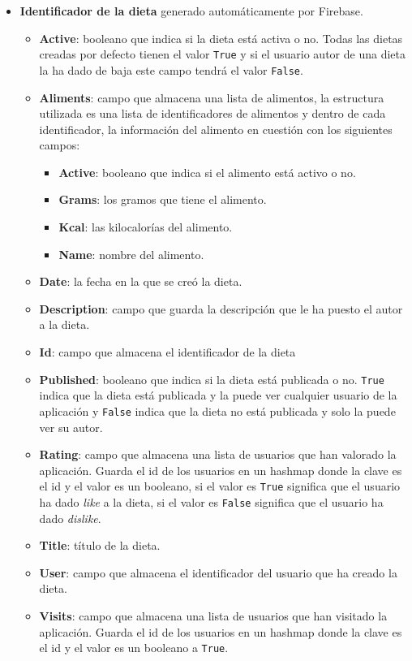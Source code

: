 \begin{itemize}
\item \textbf{Identificador de la dieta} generado automáticamente por Firebase.
    \begin{itemize}
        \item \textbf{Active}: booleano que indica si la dieta está activa o no. Todas las dietas creadas por defecto tienen el valor \texttt{True} y si el usuario autor de una dieta la ha dado de baja este campo tendrá el valor  \texttt{False}.
        \item \textbf{Aliments}: campo que almacena una lista de alimentos, la estructura utilizada es una lista de identificadores de alimentos y dentro de cada identificador, la información del alimento en cuestión con los siguientes campos:
        \begin{itemize}
            \item \textbf{Active}: booleano que indica si el alimento está activo o no.
            \item \textbf{Grams}: los gramos que tiene el alimento.
            \item \textbf{Kcal}: las kilocalorías del alimento.
            \item \textbf{Name}: nombre del alimento.
        \end{itemize}
        
        \item \textbf{Date}: la fecha en la que se creó la dieta.
        \item \textbf{Description}: campo que guarda la descripción que le ha puesto el autor a la dieta.
        \item \textbf{Id}: campo que almacena el identificador de la dieta
        \item \textbf{Published}: booleano que indica si la dieta está publicada o no. \texttt{True} indica que la dieta está publicada y la puede ver cualquier usuario de la aplicación y \texttt{False} indica que la dieta no está publicada y solo la puede ver su autor.
        \item \textbf{Rating}: campo que almacena una lista de usuarios que han valorado la aplicación. Guarda el id de los usuarios en un hashmap donde la clave es el id y el valor es un booleano, si el valor es \texttt{True} significa que el usuario ha dado \textit{like} a la dieta, si el valor es \texttt{False} significa que el usuario ha dado \textit{dislike}.
        \item \textbf{Title}: título de la dieta.
        \item \textbf{User}: campo que almacena el identificador del usuario que ha creado la dieta.
        \item \textbf{Visits}: campo que almacena una lista de usuarios que han visitado la aplicación. Guarda el id de los usuarios en un hashmap donde la clave es el id y el valor es un booleano a \texttt{True}.
    \end{itemize}
\end{itemize}



